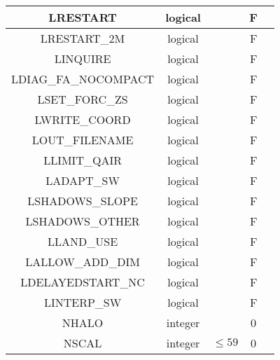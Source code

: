 {\begin{tabular}{|c|c|c|c|c|}
\hline
LRESTART                 & logical          &                                   &   F         &                 \\
\hline
LRESTART\_2M             & logical          &                                   &   F         &                 \\
\hline
LINQUIRE                 & logical          &                                   &   F         &                 \\
\hline
LDIAG\_FA\_NOCOMPACT     & logical          &                                   &   F         &                 \\
\hline
LSET\_FORC\_ZS           & logical          &                                   &   F         &                 \\
\hline
LWRITE\_COORD            & logical          &                                   &   F         &                 \\
\hline
LOUT\_FILENAME           & logical          &                                   &   F         &                 \\
\hline
LLIMIT\_QAIR             & logical          &                                   &   F         &                 \\
\hline
LADAPT\_SW               & logical          &                                   &   F         &                 \\
\hline
LSHADOWS\_SLOPE          & logical          &                                   &   F         &                 \\
\hline
LSHADOWS\_OTHER          & logical          &                                   &   F         &                 \\
\hline
LLAND\_USE               & logical          &                                   &   F         &                 \\
\hline
LALLOW\_ADD\_DIM         & logical          &                                   &   F         &                 \\
\hline
LDELAYEDSTART\_NC        & logical          &                                   &   F         &                 \\
\hline
LINTERP\_SW              & logical          &                                   &   F         &                 \\
\hline
NHALO                    & integer          &                                   &   0         &                 \\
\hline
NSCAL                    & integer          &   $\leq 59$                       &   0         &                 \\

\end{tabular}}
